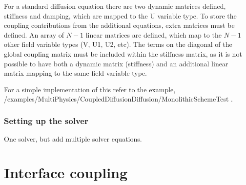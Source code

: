 For a standard diffusion equation there are two dynamic matrices defined, stiffness and damping, which are mapped to the U variable type. To store the coupling contributions from the additional equations, extra matrices must be defined. An array of $N-1$ linear matrices are defined, which map to the $N-1$ other field variable types (V, U1, U2, etc). The terms on the diagonal of the global coupling matrix must be included within the stiffness matrix, as it is not possible to have both a dynamic matrix (stiffness) and an additional linear matrix mapping to the same field variable type. 

For a simple implementation of this refer to the example, /examples/MultiPhysics/CoupledDiffusionDiffusion/MonolithicSchemeTest .

\subsubsection{Setting up the solver}

One solver, but add multiple solver equations.

\section{Interface coupling}
